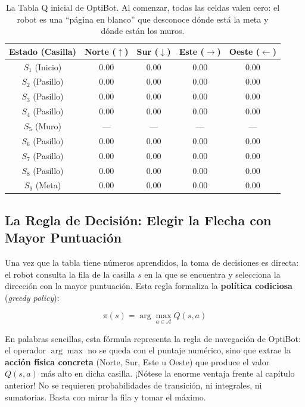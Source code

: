 \begin{table}[!htb]
\centering
\small
\begin{tabular}{ccccc}
  \toprule
  \textbf{Estado (Casilla)} & \textbf{Norte ($\uparrow$)} & \textbf{Sur ($\downarrow$)} & \textbf{Este ($\rightarrow$)} & \textbf{Oeste ($\leftarrow$)} \\
  \midrule
  $S_1$ (Inicio)  & $0.00$ & $0.00$ & $0.00$ & $0.00$ \\
  $S_2$ (Pasillo) & $0.00$ & $0.00$ & $0.00$ & $0.00$ \\
  $S_3$ (Pasillo) & $0.00$ & $0.00$ & $0.00$ & $0.00$ \\
  $S_4$ (Pasillo) & $0.00$ & $0.00$ & $0.00$ & $0.00$ \\
  $S_5$ (Muro)    & ---    & ---    & ---    & ---    \\
  $S_6$ (Pasillo) & $0.00$ & $0.00$ & $0.00$ & $0.00$ \\
  $S_7$ (Pasillo) & $0.00$ & $0.00$ & $0.00$ & $0.00$ \\
  $S_8$ (Pasillo) & $0.00$ & $0.00$ & $0.00$ & $0.00$ \\
  $S_9$ (Meta)    & $0.00$ & $0.00$ & $0.00$ & $0.00$ \\
  \bottomrule
\end{tabular}
\caption{La Tabla Q inicial de OptiBot. Al comenzar, todas las celdas valen cero: el robot es una ``página en blanco'' que desconoce dónde está la meta y dónde están los muros.}
\label{tab:q_table_initial}
\end{table}

\subsection{La Regla de Decisión: Elegir la Flecha con Mayor Puntuación}
Una vez que la tabla tiene números aprendidos, la toma de decisiones es directa: el robot consulta la fila de la casilla $s$ en la que se encuentra y selecciona la dirección con la mayor puntuación. Esta regla formaliza la \textbf{política codiciosa} (\textit{greedy policy}):

\begin{equation}
  \label{eq:politica_greedy_q}
  \pi(s) = \arg\max_{a \in \mathcal{A}} Q(s, a)
\end{equation}

En palabras sencillas, esta fórmula representa la regla de navegación de OptiBot: el operador $\arg\max$ no se queda con el puntaje numérico, sino que extrae la \textbf{acción física concreta} (Norte, Sur, Este u Oeste) que produce el valor $Q(s, a)$ más alto en dicha casilla. ¡Nótese la enorme ventaja frente al capítulo anterior! No se requieren probabilidades de transición, ni integrales, ni sumatorias. Basta con mirar la fila y tomar el máximo.

